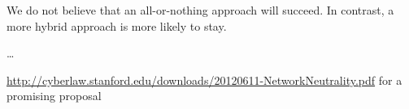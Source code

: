 
We do not believe that an all-or-nothing approach will succeed. In contrast, a more hybrid approach is more likely to stay.

\ldots

 \url{http://cyberlaw.stanford.edu/downloads/20120611-NetworkNeutrality.pdf} for a promising proposal